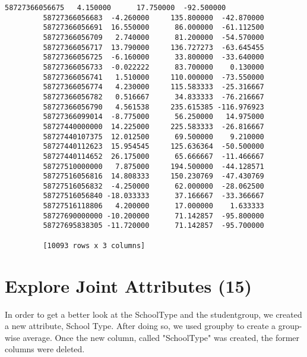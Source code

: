 \documentclass[11pt]{article}
\begin{document}
\begin{Verbatim}[commandchars=\\\{\}]
         58727366056675   4.150000      17.750000  -92.500000
         58727366056683  -4.260000     135.800000  -42.870000
         58727366056691  16.550000      86.000000  -61.112500
         58727366056709   2.740000      81.200000  -54.570000
         58727366056717  13.790000     136.727273  -63.645455
         58727366056725  -6.160000      33.800000  -33.640000
         58727366056733  -0.022222      83.700000    0.130000
         58727366056741   1.510000     110.000000  -73.550000
         58727366056774   4.230000     115.583333  -25.316667
         58727366056782   0.516667      34.833333  -76.216667
         58727366056790   4.561538     235.615385 -116.976923
         58727366099014  -8.775000      56.250000   14.975000
         58727440000000  14.225000     225.583333  -26.816667
         58727440107375  12.012500      69.500000    9.210000
         58727440112623  15.954545     125.636364  -50.500000
         58727440114652  26.175000      65.666667  -11.466667
         58727510000000   7.875000     194.500000  -44.128571
         58727516056816  14.808333     150.230769  -47.430769
         58727516056832  -4.250000      62.000000  -28.062500
         58727516056840 -18.033333      37.166667  -33.366667
         58727516118806   4.200000      17.000000    1.633333
         58727690000000 -10.200000      71.142857  -95.800000
         58727695838305 -11.720000      71.142857  -95.700000
         
         [10093 rows x 3 columns]
\end{Verbatim}
            
    \section{Explore Joint Attributes
(15)}\label{explore-joint-attributes-15}

In order to get a better look at the SchoolType and the studentgroup, we
created a new attribute, School Type. After doing so, we used groupby to
create a group-wise average. Once the new column, called "SchoolType"
was created, the former columns were deleted.
\end{document}
